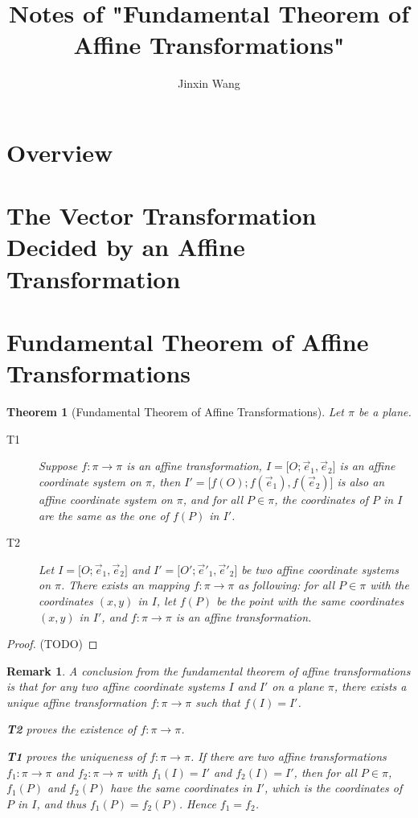 \documentclass[onecolumn]{ctexart}
\title{Notes of "Fundamental Theorem of Affine Transformations"}
\author{Jinxin Wang}
\date{}
\newtheorem{theorem}{Theorem}
\newtheorem{remark}{Remark}
\begin{document}
\maketitle

\section{Overview}

\section{The Vector Transformation Decided by an Affine Transformation}

\section{Fundamental Theorem of Affine Transformations}

\begin{theorem}[Fundamental Theorem of Affine Transformations]
  Let $\pi$ be a plane.
  \begin{description}
    \item[T1] Suppose $f: \pi \to \pi$ is an affine transformation, $I = \lbrack 
    O; \vec{e}_1, \vec{e}_2 \rbrack$ is an affine coordinate system on $\pi$, 
    then $I' = \lbrack f(O); f(\vec{e}_1), f(\vec{e}_2) \rbrack$ is also an 
    affine coordinate system on $\pi$, and for all $P \in \pi$, the coordinates 
    of $P$ in $I$ are the same as the one of $f(P)$ in $I'$.
    \item[T2] Let $I = \lbrack O; \vec{e}_1, \vec{e}_2 \rbrack$ and $I' = \lbrack 
    O'; \vec{e}'_1, \vec{e}'_2 \rbrack$ be two affine coordinate systems on $\pi$. 
    There exists an mapping $f: \pi \to \pi$ as following: for all $P \in \pi$ 
    with the coordinates $(x, y)$ in $I$, let $f(P)$ be the point with the same 
    coordinates $(x, y)$ in $I'$, and $f: \pi \to \pi$ is an affine 
    transformation.
  \end{description}
\end{theorem}
\begin{proof}
  (TODO)
\end{proof}

\begin{remark}
  A conclusion from the fundamental theorem of affine transformations is that 
  for any two affine coordinate systems $I$ and $I'$ on a plane $\pi$, there 
  exists a unique affine transformation $f: \pi \to \pi$ such that $f(I) = I'$.

  \textbf{T2} proves the existence of $f: \pi \to \pi$.

  \textbf{T1} proves the uniqueness of $f: \pi \to \pi$. If there are two affine 
  transformations $f_1: \pi \to \pi$ and $f_2: \pi \to \pi$ with $f_1(I) = I'$ 
  and $f_2(I) = I'$, then for all $P \in \pi$, $f_1(P)$ and $f_2(P)$ have the 
  same coordinates in $I'$, which is the coordinates of $P$ in $I$, and thus 
  $f_1(P) = f_2(P)$. Hence $f_1 = f_2$.
\end{remark}
\end{document}
